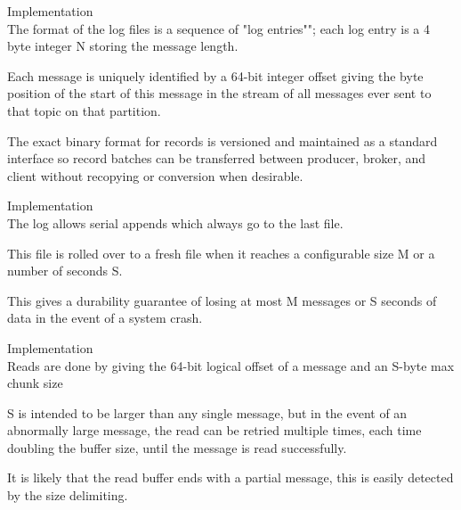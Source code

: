 \begin{frame}[plain,t]{Implementation} %
     \\
    \vspace{2ex}
  The format of the log files is a sequence of "log entries""; each log entry is a 4 byte integer N storing the message length.
  
  \vspace{2ex}
  Each message is uniquely identified by a 64-bit integer offset giving the byte position of the start of this message in the stream of all messages ever sent to that topic on that partition.
    
    
     \vspace{2ex}
     The exact binary format for records is versioned and maintained as a standard interface so record batches can be transferred between producer, broker, and client without recopying or conversion when desirable.
    
    
    
\end{frame}
\begin{frame}[plain,t]{Implementation} %
     \\
    \vspace{2ex}
    The log allows serial appends which always go to the last file. 
    
    \vspace{2ex}
    This file is rolled over to a fresh file when it reaches a configurable size M or a number of seconds S.
    
    \vspace{2ex}
    This gives a durability guarantee of losing at most M messages or S seconds of data in the event of a system crash.
    
    
\end{frame}
\begin{frame}[plain,t]{Implementation} %
     \\
    \vspace{2ex}
    Reads are done by giving the 64-bit logical offset of a message and an S-byte max chunk size
    
    \vspace{2ex}
    S is intended to be larger than any single message, but in the event of an abnormally large message, the read can be retried multiple times, each time doubling the buffer size, until the message is read successfully.
    
    \vspace{2ex}
    It is likely that the read buffer ends with a partial message, this is easily detected by the size delimiting.
    
    
    
    
\end{frame}
